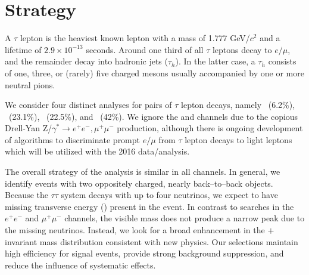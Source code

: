 \chapter{Strategy}\label{sec:strategy}

A $\tau$ lepton is the heaviest known lepton with a mass of 1.777 GeV/$c^2$ and a lifetime of $2.9\times10^{-13}$ seconds. Around one third of
all $\tau$ leptons decay to $e/\mu$, and the remainder decay into hadronic jets ($\tau_{h}$). 
In the latter case, a $\tau_{h}$ consists of one, three, or (rarely) five charged mesons usually accompanied by one or
more neutral pions.

We consider four distinct analyses for pairs of $\tau$ lepton decays, namely \emu ~(6.2\%), \etau ~(23.1\%), \mutau  ~(22.5\%), and
\ditauhad ~(42\%). We ignore the \EE and \MM channels due to the copious Drell-Yan
Z/$\gamma^*\rightarrow e^+e^-, \mu^+\mu^-$ production, although there is ongoing development of algorithms to discriminate prompt $e/\mu$ from $\tau$ lepton 
decays to light leptons which will be utilized with the 2016 data/analysis.

The overall strategy of the analysis is similar in all channels. 
In general, we identify events with two oppositely charged, nearly back--to--back objects. Because the $\tau\tau$ system decays with up
to four neutrinos, we expect to have missing transverse energy (\MET) present in the event. In contrast to \zprime searches in the
$e^+e^-$ and $\mu^+\mu^-$ channels, the visible \ditau mass does not produce a narrow peak due to the missing neutrinos.
Instead, we look for a broad enhancement in the \ditau$+$\MET invariant mass distribution consistent with new physics.  Our
selections maintain high efficiency for signal events, provide strong background suppression, and reduce the influence of systematic
effects.  

